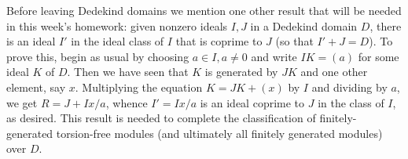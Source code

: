 Before leaving Dedekind domains we mention one other result that will be needed in this week's homework:  given nonzero ideals $I,J$ in a Dedekind domain $D$, there is an ideal $I'$ in the ideal class of $I$ that is coprime to $J$ (so that $I'+J = D$).  To prove this, begin as usual by choosing
$a\in I, a\ne0$ and write $IK = (a)$ for some ideal $K$ of $D$.  Then we have seen that $K$ is generated by $JK$ and one other element, say $x$.  Multiplying the equation $K = JK + (x)$ by $I$ and dividing by $a$, we get $R = J + Ix/a$, whence $I' = Ix/a$ is an ideal coprime to $J$ in the class of $I$, as desired.  This result is needed to complete the classification of finitely-generated torsion-free modules (and ultimately all finitely generated modules) over $D$.

